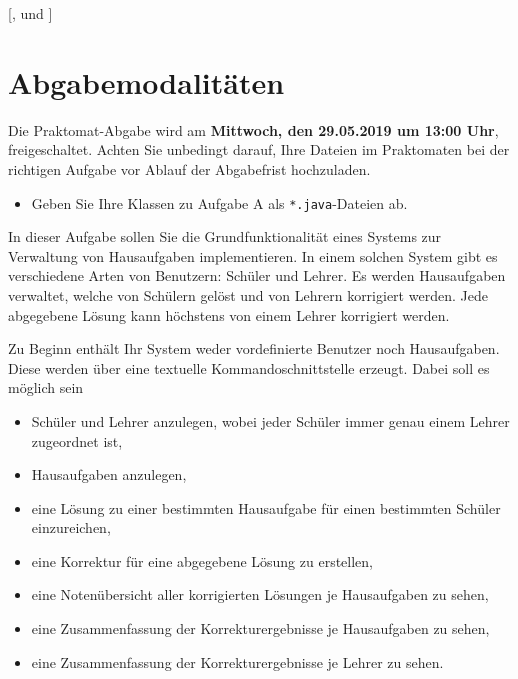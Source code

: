 \documentclass{sdqassignment}
\begin{document}


[,  und ]

\section*{Abgabemodalitäten}
Die Praktomat-Abgabe wird am \textbf{Mittwoch, den 29.05.2019 um 13:00 Uhr}, freigeschaltet. Achten Sie unbedingt darauf, Ihre Dateien im Praktomaten bei der richtigen Aufgabe vor Ablauf der Abgabefrist hochzuladen.

\begin{itemize}
    \item Geben Sie Ihre Klassen zu Aufgabe A als \texttt{*.java}-Dateien ab.
\end{itemize}

\terminalinfo

\newpage

In dieser Aufgabe sollen Sie die Grundfunktionalität eines Systems zur Verwaltung von Hausaufgaben implementieren. In einem solchen System gibt es verschiedene Arten von Benutzern: Schüler und Lehrer. Es werden Hausaufgaben verwaltet, welche von Schülern gelöst und von Lehrern korrigiert werden. Jede abgegebene Lösung kann höchstens von einem Lehrer korrigiert werden.

Zu Beginn enthält Ihr System weder vordefinierte Benutzer noch Hausaufgaben. Diese werden über eine textuelle Kommandoschnittstelle erzeugt. Dabei soll es möglich sein
\begin{itemize}
    \item Schüler und Lehrer anzulegen, wobei jeder Schüler immer genau einem Lehrer zugeordnet ist,
    \item Hausaufgaben anzulegen,
    \item eine Lösung zu einer bestimmten Hausaufgabe für einen bestimmten Schüler einzureichen,
    \item eine Korrektur für eine abgegebene Lösung zu erstellen,
    \item eine Notenübersicht aller korrigierten Lösungen je Hausaufgaben zu sehen,
    \item eine Zusammenfassung der Korrekturergebnisse je Hausaufgaben zu sehen,
    \item eine Zusammenfassung der Korrekturergebnisse je Lehrer zu sehen.
\end{itemize}
\end{document}
